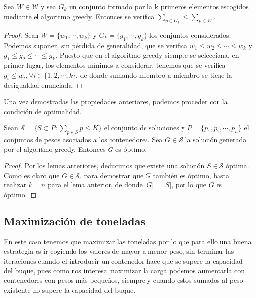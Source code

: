 \begin{lemma}
    Sea $W \in \mathcal W$ y sea $G_k$ un conjunto formado
    por la k primeros elementos escogidos mediante el algoritmo greedy. 
    Entonces se verifica $\sum_{p \in G_k} \leq \sum_{p \in W}$. 
\end{lemma}

\begin{proof}
    Sean $W = \{w_1,\cdots, w_k\}$ y $G_k = \{g_1,\cdots,g_k\}$ los conjuntos considerados.
    Podemos suponer, sin pérdida de generalidad, que se verifica
    $w_1 \leq w_2 \leq \cdots \leq w_k$ y $g_1 \leq g_2 \leq \cdots \leq g_k$. 
    Puesto que en el algoritmo greedy siempre se selecciona, en primer lugar, los elementos
    mínimos a considerar, tenemos que se verifica $g_i \leq w_i, \forall i \in \{1,2,\cdots,k\}$,
    de donde sumando miembro a miembro se tiene la desigualdad enunciada.

\end{proof}

Una vez demostradas las propiedades anteriores, podemos proceder con la condición
de optimalidad.

\begin{theorem}
    Sean $\mathcal{S} = \{S \subset P : \sum_{p \in S} p \leq K\}$ el conjunto de soluciones y
    $P = \{p_1,p_2,\cdots,p_n\}$ el conjuntos de pesos asociados
a los contenedores. 
    Sea $G \in \mathcal S$ la solución generada por el algoritmo greedy. Entonces
    $G$ es óptimo. 
\end{theorem}

\begin{proof}
    Por los lemas anteriores, deducimos que existe una solución $S \in \mathcal S$ óptima.
    Como es claro que $G \in \mathcal S$, para demostrar que $G$ también es óptimo, 
    basta realizar $k = n$ para el lema anterior, de donde $|G| = |S|$, por lo que
    $G$ es óptimo.
\end{proof}

\newpage

\subsection{Maximización de toneladas}
En este caso tenemos que maximizar las toneladas por lo que para ello una buena estrategia es ir cogiendo los valores 
de mayor a menor peso, sin terminar las iteraciones cuando el introducir un contenedor hace que se supere la capacidad del
buque, pues como nos interesa maximizar la carga podemos aumentarla con contenedores con pesos más pequeños, siempre y cuando 
estos sumados al peso existente no supere la capacidad del buque.

